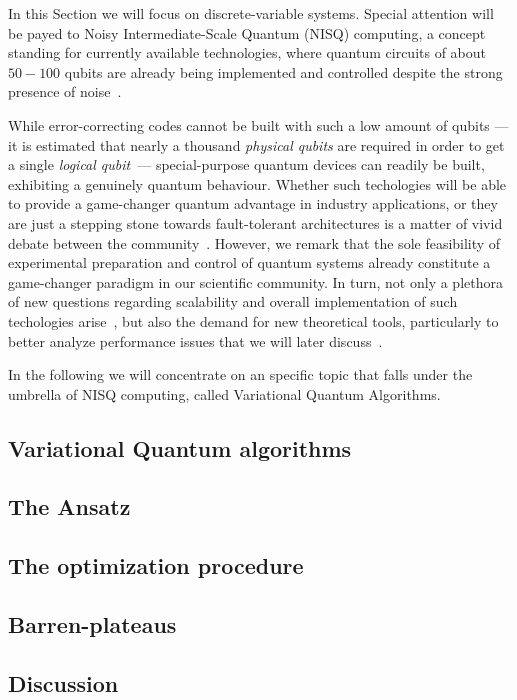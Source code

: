 In this Section we will focus on discrete-variable systems. Special attention will be payed to Noisy Intermediate-Scale Quantum (NISQ) computing, a concept standing for currently available technologies, where quantum circuits of about $50-100$ qubits are already being implemented and controlled despite the strong presence of noise~\cite{preskill2018quantum}.

While error-correcting codes cannot be built with such a low amount of qubits ---it is estimated that nearly a thousand \textit{physical qubits} are required in order to get a single \textit{logical qubit}~\cite{Fowler2012surface}--- special-purpose quantum devices can readily be built, exhibiting a genuinely quantum behaviour. Whether such techologies will be able to provide a game-changer quantum advantage in industry applications, or they are just a stepping stone towards fault-tolerant architectures is a matter of vivid debate between the community~\cite{supremacygoogle,nosupremacy,chemistrynono}. However, we remark that the sole feasibility of experimental preparation and control of quantum systems already constitute a game-changer paradigm in our scientific community. In turn, not only a plethora of new questions regarding scalability and overall implementation of such techologies arise~\cite{useful2discoverQC}, but also the demand for new theoretical tools, particularly to better analyze performance issues that we will later discuss~\cite{mcclean2018barren,cerezo2020cost,pesah2020absence,holmes2020barren,zhao2021analyzing,thanasilp2021subtleties,sharma2020trainability,patti2020entanglement,marrero2020entanglement,cerezo2020impact,arrasmith2020effect, npHardVQA}.

In the following we will concentrate on an specific topic that falls under the umbrella of NISQ computing, called Variational Quantum Algorithms.

\subsection{Variational Quantum algorithms}\label{ssec:1_nisq_vqa}


\subsection{The Ansatz}\label{ssec:1_nisq_vans_bp}


\subsection{The optimization procedure}\label{ssec:optimizer}


\subsection{Barren-plateaus}\label{ssec:1_nisq_barrenplateaus}


\subsection{Discussion}\label{ssec:1_nisq_discu}

